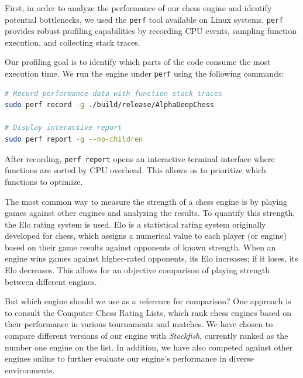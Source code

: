First, in order to analyze the performance of our chess engine and identify potential bottlenecks, we used the \texttt{perf} tool available on Linux systems. \texttt{perf} provides robust profiling capabilities by recording CPU events, sampling function execution, and collecting stack traces.

\vspace{1em}

\noindent Our profiling goal is to identify which parts of the code consume the most execution time. We run the engine under \texttt{perf} using the following commands:

\begin{lstlisting}[language=bash, caption={Profiling \textit{AlphaDeepChess} with perf}, frame=single, breaklines=true]
# Record performance data with function stack traces
sudo perf record -g ./build/release/AlphaDeepChess

# Display interactive report
sudo perf report -g --no-children
\end{lstlisting}

\noindent After recording, \texttt{perf report} opens an interactive terminal interface where functions are sorted by CPU overhead. This allows us to prioritize which functions to optimize.

\noindent The most common way to measure the strength of a chess engine is by playing games against other engines and analyzing the results. To quantify this strength, the Elo rating system is used. Elo is a statistical rating system originally developed for chess, which assigns a numerical value to each player (or engine) based on their game results against opponents of known strength. When an engine wins games against higher-rated opponents, its Elo increases; if it loses, its Elo decreases. This allows for an objective comparison of playing strength between different engines.

\vspace{1em}

\noindent But which engine should we use as a reference for comparison? One approach is to consult the Computer Chess Rating Lists, which rank chess engines based on their performance in various tournaments and matches. We have chosen to compare different versions of our engine with \textit{Stockfish}, currently ranked as the number one engine on the list. In addition, we have also competed against other engines online to further evaluate our engine's performance in diverse environments.

\vspace{1em}

